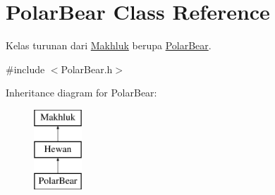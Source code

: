\hypertarget{class_polar_bear}{}\section{Polar\+Bear Class Reference}
\label{class_polar_bear}


Kelas turunan dari \hyperlink{class_makhluk}{Makhluk} berupa \hyperlink{class_polar_bear}{Polar\+Bear}.  




{\ttfamily \#include $<$Polar\+Bear.\+h$>$}

Inheritance diagram for Polar\+Bear\+:\begin{figure}[H]
\begin{center}
\leavevmode
\includegraphics[height=3.000000cm]{class_polar_bear}
\end{center}
\end{figure}
